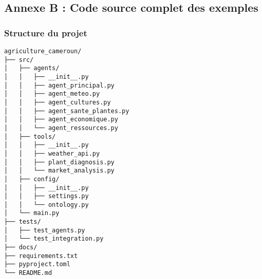 \subsection{Annexe B : Code source complet des exemples}

\subsubsection{Structure du projet}
\begin{verbatim}
agriculture_cameroun/
├── src/
│   ├── agents/
│   │   ├── __init__.py
│   │   ├── agent_principal.py
│   │   ├── agent_meteo.py
│   │   ├── agent_cultures.py
│   │   ├── agent_sante_plantes.py
│   │   ├── agent_economique.py
│   │   └── agent_ressources.py
│   ├── tools/
│   │   ├── __init__.py
│   │   ├── weather_api.py
│   │   ├── plant_diagnosis.py
│   │   └── market_analysis.py
│   ├── config/
│   │   ├── __init__.py
│   │   ├── settings.py
│   │   └── ontology.py
│   └── main.py
├── tests/
│   ├── test_agents.py
│   └── test_integration.py
├── docs/
├── requirements.txt
├── pyproject.toml
└── README.md
\end{verbatim}

